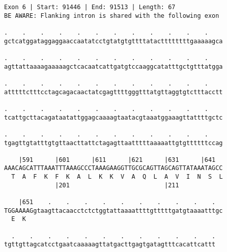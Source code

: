 \documentclass{article}
\begin{document}
\begin{Verbatim}
Exon 6 | Start: 91446 | End: 91513 | Length: 67
BE AWARE: Flanking intron is shared with the following exon
 
.    .    .    .    .    .    .    .    .    .    .    .    
gctcatggataggaggaaccaatatcctgtatgtgttttatacttttttttgaaaaagca
  
.    .    .    .    .    .    .    .    .    .    .    .    
agttattaaaagaaaaagctcacaatcattgatgtccaaggcatatttgctgtttatgga
  
.    .    .    .    .    .    .    .    .    .    .    .    
atttttctttcctagcagacaactatcgagttttgggtttatgttaggtgtctttacctt
  
.    .    .    .    .    .    .    .    .    .    .    .    
tcattgcttacagataatattggagcaaaagtaatacgtaaatggaaagttattttgctc
  
.    .    .    .    .    .    .    .    .    .    .    .    
tgagttgtatttgtgttaacttattctagagttaatttttaaaaattgtgttttttccag
  
    |591      |601      |611      |621      |631      |641  
AAACAGCATTTAAATTTAAAGCCCTAAAGAAGGTTGCGCAGTTAGCAGTTATAAATAGCC
  T  A  F  K  F  K  A  L  K  K  V  A  Q  L  A  V  I  N  S  L
              |201                          |211            
  
    |651    .    .    .    .    .    .    .    .    .    .  
TGGAAAAGgtaagttacaacctctctggtattaaaattttgtttttgatgtaaaatttgc
  E  K                                                      
  
  .    .    .    .    .    .    .    .    .    .    .    .
tgttgttagcatcctgaatcaaaaagttatgacttgagtgatagtttcacattcattt
\end{Verbatim}
\newpage
\end{document}
